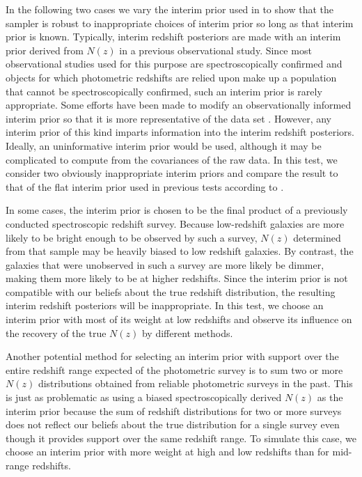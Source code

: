 In the following two cases we vary the interim prior used in  to show that the sampler is robust to inappropriate choices of interim prior so long as that interim prior is known.  
Typically, interim redshift posteriors are made with an interim prior derived from $N(z)$ in a previous observational study.  
Since most observational studies used for this purpose are spectroscopically confirmed and objects for which photometric redshifts are relied upon make up a population that cannot be spectroscopically confirmed, such an interim prior is rarely appropriate.  
Some efforts have been made to modify an observationally informed interim prior so that it is more representative of the data set \citep{Sheldon2012}.  
However, any interim prior of this kind imparts information into the interim redshift posteriors.  
Ideally, an uninformative interim prior would be used, although it may be complicated to compute from the covariances of the raw data.  
In this test, we consider two obviously inappropriate interim priors and compare the result to that of the flat interim prior used in previous tests according to .

In some cases, the interim prior is chosen to be the final product of a previously conducted spectroscopic redshift survey.  
Because low-redshift galaxies are more likely to be bright enough to be observed by such a survey, $N(z)$ determined from that sample may be heavily biased to low redshift galaxies.  
By contrast, the galaxies that were unobserved in such a survey are more likely be dimmer, making them more likely to be at higher redshifts.  
Since the interim prior is not compatible with our beliefs about the true redshift distribution, the resulting interim redshift posteriors will be inappropriate.  
In this test, we choose an interim prior with most of its weight at low redshifts and observe its influence on the recovery of the true $N(z)$ by different methods.  

Another potential method for selecting an interim prior with support over the entire redshift range expected of the photometric survey is to sum two or more $N(z)$ distributions obtained from reliable photometric surveys in the past.  
This is just as problematic as using a biased spectroscopically derived $N(z)$ as the interim prior because the sum of redshift distributions for two or more surveys does not reflect our beliefs about the true distribution for a single survey even though it provides support over the same redshift range.  
To simulate this case, we choose an interim prior with more weight at high and low redshifts than for mid-range redshifts.  

